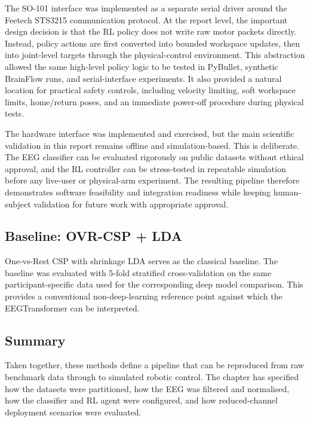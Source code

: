 \documentclass[12pt, a4paper]{article}
\begin{document}
The SO-101 interface was implemented as a separate serial driver around the Feetech STS3215 communication protocol. At the report level, the important design decision is that the RL policy does not write raw motor packets directly. Instead, policy actions are first converted into bounded workspace updates, then into joint-level targets through the physical-control environment. This abstraction allowed the same high-level policy logic to be tested in PyBullet, synthetic BrainFlow runs, and serial-interface experiments. It also provided a natural location for practical safety controls, including velocity limiting, soft workspace limits, home/return poses, and an immediate power-off procedure during physical tests.

The hardware interface was implemented and exercised, but the main scientific validation in this report remains offline and simulation-based. This is deliberate. The EEG classifier can be evaluated rigorously on public datasets without ethical approval, and the RL controller can be stress-tested in repeatable simulation before any live-user or physical-arm experiment. The resulting pipeline therefore demonstrates software feasibility and integration readiness while keeping human-subject validation for future work with appropriate approval.

\subsection{Baseline: OVR-CSP + LDA}

One-vs-Rest CSP with shrinkage LDA serves as the classical baseline. The baseline was evaluated with 5-fold stratified cross-validation on the same participant-specific data used for the corresponding deep model comparison. This provides a conventional non-deep-learning reference point against which the EEGTransformer can be interpreted.

\subsection{Summary}

Taken together, these methods define a pipeline that can be reproduced from raw benchmark data through to simulated robotic control. The chapter has specified how the datasets were partitioned, how the EEG was filtered and normalised, how the classifier and RL agent were configured, and how reduced-channel deployment scenarios were evaluated.
\end{document}
